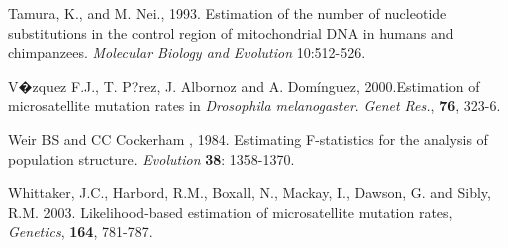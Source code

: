 \begin{thebibliography}{a}
 Tamura, K., and M. Nei., 1993.
Estimation of the number of nucleotide substitutions in the control
region of mitochondrial DNA in humans and chimpanzees. \emph{Molecular
Biology and Evolution} 10:512-526.

 V�zquez F.J., T.
P?rez, J. Albornoz and A. Dom\'{i}nguez, 2000.Estimation of microsatellite
mutation rates in \emph{Drosophila melanogaster}. \emph{Genet Res.},
\textbf{76}, 323-6.

Weir BS and CC Cockerham
, 1984. Estimating F-statistics for the analysis of population structure.
\emph{Evolution} \textbf{38}: 1358-1370.

 Whittaker, J.C., Harbord,
R.M., Boxall, N., Mackay, I., Dawson, G. and Sibly, R.M. 2003. Likelihood-based
estimation of microsatellite mutation rates, \emph{Genetics}, \textbf{164},
781-787. \end{thebibliography}
